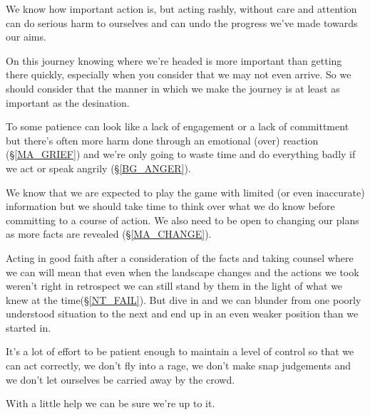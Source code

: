 \cleardoublepage
{ \small
We know how important action is, but acting rashly, without care and attention can do serious harm to ourselves and can undo the progress we've made towards our aims.

On this journey knowing where we're headed is more important than getting there quickly, especially when you consider that we may not even arrive. So we should consider that the manner in which we make the journey is at least as important as the desination.

To some patience can look like a lack of engagement or a lack of committment but there's often more harm done through an emotional (over) reaction (\S \ref{MA_GRIEF}) and we're only going to waste time and do everything badly if we act or speak angrily (\S \ref{BG_ANGER}).

We know that we are expected to play the game with limited (or even inaccurate) information but we should take time to think over what we do know before committing to a course of action. We also need to be open to changing our plans as more facts are revealed (\S \ref{MA_CHANGE}).  

Acting in good faith after a consideration of the facts and taking counsel where we can will mean that even when the landscape changes and the actions we took weren't right in retrospect we can still stand by them in the light of what we knew at the time(\S \ref{NT_FAIL}). But dive in and we can blunder from one poorly understood situation to the next and end up in an even weaker position than we started in. 

It's a lot of effort to be patient enough to maintain a level of control so that we can act correctly, we don't fly into a rage, we don't make snap judgements and we don't let ourselves be carried away by the crowd.

With a little help we can be sure we're up to it.
}

